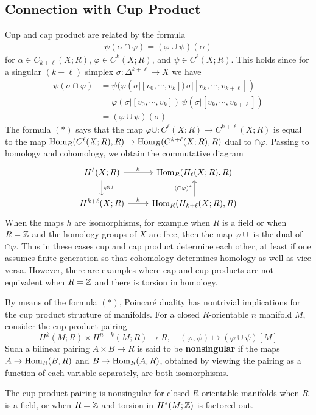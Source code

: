 \subsection{Connection with Cup Product}
Cup and cap product are related by the formula
\begin{align}
\psi(\alpha\cap\varphi)=(\varphi\cup\psi)(\alpha)\tag{$\ast$}
\end{align}
for $\alpha\in C_{k+\ell}(X;R)$, $\varphi\in C^k(X;R)$, and $\psi\in C^\ell(X;R)$. This holds since for a singular $(k+\ell)$ simplex $\sigma:\Delta^{k+\ell}\to X$ we have
\begin{align*}
\psi(\sigma\cap\varphi)&=\psi(\varphi(\sigma|[v_0,\cdots,v_k])\,\sigma|[v_k,\cdots,v_{k+\ell}])\\
&=\varphi(\sigma|[v_0,\cdots,v_k])\,\psi(\sigma|[v_k,\cdots,v_{k+\ell}])\\
&=(\varphi\cup\psi)(\sigma)
\end{align*}
The formula $(*)$ says that the map $\varphi\cup:C^\ell(X;R)\to C^{k+\ell}(X;R)$ is equal to the map $\mathrm{Hom}_R(C^\ell(X;R),R)\to\mathrm{Hom}_R(C^{k+\ell}(X;R),R)$ dual to $\cap\varphi$. Passing to homology and cohomology, we obtain the commutative diagram
\[\begin{tikzcd}
H^\ell(X;R)\ar[r,"h"]\ar[d,"\varphi\cup"]&\Hom_R(H_\ell(X;R),R)\\
H^{k+\ell}(X;R)\ar[r,"h"]&\Hom_R(H_{k+\ell}(X;R),R)\ar[u,"(\cap\varphi)^*"]
\end{tikzcd}\]
When the maps $h$ are isomorphisms, for example when $R$ is a field or when $R=\mathbb{Z}$ and the homology groups of $X$ are free, then the map $\varphi\cup$ is the dual of $\cap\varphi$. Thus in these cases cup and cap product determine each other, at least if one assumes finite generation so that cohomology determines homology as well as vice versa. However, there are examples where cap and cup products are not equivalent when $R=\mathbb{Z}$ and there is torsion in homology.\par
By means of the formula $(*)$, Poincar\'e duality has nontrivial implications for the cup product structure of manifolds. For a closed $R$-orientable $n$ manifold $M$, consider the cup product pairing
\[H^k(M;R)\times H^{n-k}(M;R)\to R,\quad (\varphi,\psi)\mapsto(\varphi\cup\psi)[M]\]
Such a bilinear pairing $A\times B\to R$ is said to be \textbf{nonsingular} if the maps $A\to\mathrm{Hom}_R(B,R)$ and $B\to\mathrm{Hom}_R(A,R)$, obtained by viewing the pairing as a function of each variable separately, are both isomorphisms.
\begin{proposition}
The cup product pairing is nonsingular for closed $R$-orientable manifolds when $R$ is a field, or when $R=\mathbb{Z}$ and torsion in $H^*(M;\mathbb{Z})$ is factored out.
\end{proposition}
